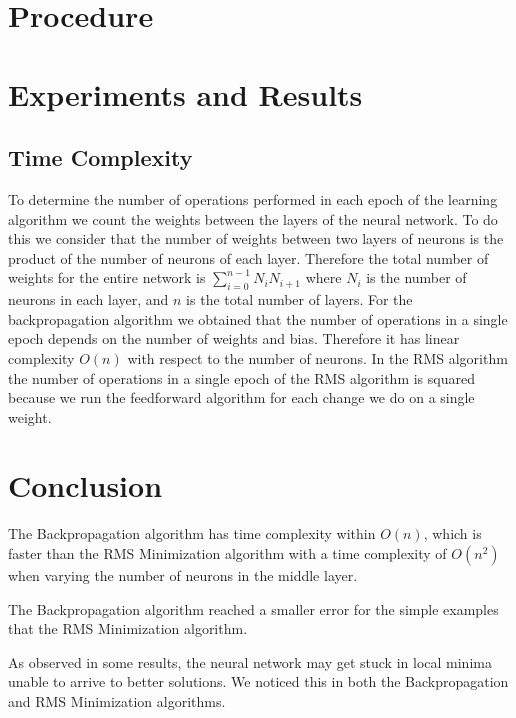 \documentclass[11pt]{article}
\newcommand{\daniel}[1]{{\textbf{{\small{\color{magenta}DL}: #1{\color{magenta}$\circ$}}}}}
\newcommand{\owen}[1]{\textbf{{\small{\color{red}OK}: #1{\color{red}$\circ$}}}}
\begin{document}



\section{Procedure} %
\label{sec:procedure}



\section{Experiments and Results} %
\label{sec:results}

\subsection{Time Complexity} %
\label{sub:time_complexity}

To determine the number of operations performed in each epoch of the learning algorithm we count the weights between the layers of the
neural network. To do this we consider that the number of weights between two layers of neurons is the product of the number of neurons
of each layer. Therefore the total number of weights for the entire network is $\sum_{i=0}^{n-1}N_{i}N_{i+1}$ where $N_{i}$ is the
number of neurons in each layer, and $n$ is the total number of layers. For the backpropagation algorithm we obtained that the number
of operations in a single epoch depends on the number of weights and bias. Therefore it has linear complexity $O(n)$ with respect to
the number of neurons. In the RMS algorithm the number of operations in a single epoch of the RMS algorithm is squared because we run
the feedforward algorithm for each change we do on a single weight.



\section{Conclusion} %
\label{sec:conclusion}

The Backpropagation algorithm has time complexity within $O(n)$, which is faster than the RMS Minimization algorithm with a time
complexity of $O(n^{2})$ when varying the number of neurons in the middle layer. 

The Backpropagation algorithm reached a smaller error for the simple examples that the RMS Minimization algorithm.

As observed in some results, the neural network may get stuck in local minima unable to arrive to better solutions. We noticed this in
both the Backpropagation and RMS Minimization algorithms.

    


\end{document}
